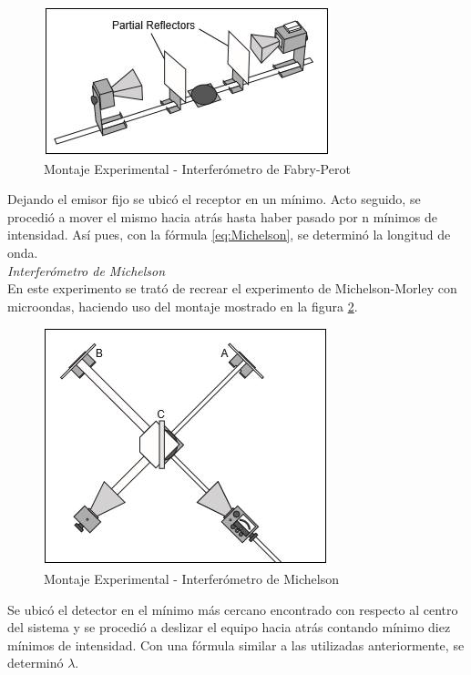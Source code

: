 \documentclass[%
 reprint,
 amsmath,amssymb,
 aps,
]{revtex4-1}
\begin{document}
\begin{figure}[h!]
\centering
\includegraphics[width=0.7\linewidth]{Pictures/fabryperot}
\caption{Montaje Experimental - Interferómetro de Fabry-Perot}
\label{fig:fabryperot}
\end{figure}

Dejando el emisor fijo se ubicó el receptor en un mínimo. Acto seguido, se procedió a mover el mismo hacia atrás hasta haber pasado por n mínimos de intensidad. Así pues, con la fórmula \ref{eq:Michelson}, se determinó la longitud de onda. \\ 

\textit{Interferómetro de Michelson} \\

En este experimento se trató de recrear el experimento de Michelson-Morley con microondas, haciendo uso del montaje mostrado en la figura \ref{fig:intmichelson}. \\

\begin{figure}[h!]
\centering
\includegraphics[width=0.7\linewidth]{Pictures/intmichelson}
\caption{Montaje Experimental - Interferómetro de Michelson}
\label{fig:intmichelson}
\end{figure}

Se ubicó el detector en el mínimo más cercano encontrado con respecto al centro del sistema y se procedió a deslizar el equipo hacia atrás contando mínimo diez mínimos de intensidad. Con una fórmula similar a las utilizadas anteriormente, se determinó $ \lambda $. \\
\end{document}

